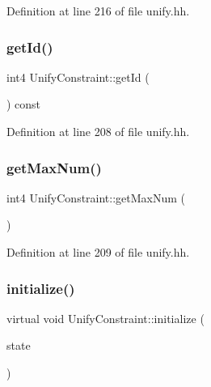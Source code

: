 Definition at line 216 of file unify.\+hh.

\mbox{\label{class_unify_constraint_a049013abc1805120f71abef80bc6435a}} 
\subsubsection{\texorpdfstring{getId()}{getId()}}
{\footnotesize\ttfamily int4 Unify\+Constraint\+::get\+Id (\begin{DoxyParamCaption}\item[{void}]{ }\end{DoxyParamCaption}) const\hspace{0.3cm}{\ttfamily [inline]}}



Definition at line 208 of file unify.\+hh.

\mbox{\label{class_unify_constraint_a93c5666cbe0707cfb6aa40d284dca457}} 
\subsubsection{\texorpdfstring{getMaxNum()}{getMaxNum()}}
{\footnotesize\ttfamily int4 Unify\+Constraint\+::get\+Max\+Num (\begin{DoxyParamCaption}\item[{void}]{ }\end{DoxyParamCaption})\hspace{0.3cm}{\ttfamily [inline]}}



Definition at line 209 of file unify.\+hh.

\mbox{\label{class_unify_constraint_ac812e2cf68c95e8a5c0e7e8ac02f2fc2}} 
\subsubsection{\texorpdfstring{initialize()}{initialize()}}
{\footnotesize\ttfamily virtual void Unify\+Constraint\+::initialize (\begin{DoxyParamCaption}\item[{\mbox{\hyperlink{class_unify_state}{Unify\+State}} \&}]{state }\end{DoxyParamCaption})\hspace{0.3cm}{\ttfamily [virtual]}}



